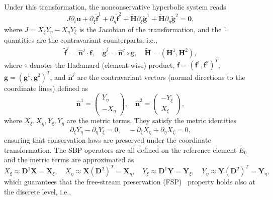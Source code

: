 \documentclass[]{scrartcl}
\newcommand{\mtx}[1]{\boldsymbol{#1}}
\renewcommand{\vec}[1]{\boldsymbol{#1}}
\theoremstyle{definition}
\begin{document}
Under this transformation, the nonconservative hyperbolic system reads
\begin{equation}
J \partial_t \vec{u} + \partial_\xi \tilde{\vec{f}}^1 + \partial_\eta \tilde{\vec{f}}^2 + \tilde{\vec{H}} \partial_\xi \tilde{\vec{g}}^1 + \tilde{\vec{H}} \partial_\eta \tilde{\vec{g}}^2 = \vec{0},
\end{equation}
where $J = X_\xi Y_\eta - X_\eta Y_\xi$ is the Jacobian of the transformation, and the $\tilde{\cdot}$ quantities are the contravariant counterparts, i.e.,
\begin{equation}
    \tilde{\vec{f}}^j = \hat{\vec{n}}^j \cdot \vec{f}, \quad
    \tilde{\vec{g}}^j = \hat{\vec{n}}^j \circ \vec{g}, \quad
    \tilde{\vec{H}} = \left (\vec{H}^1, \vec{H}^2 \right ),
\end{equation}
where $\circ$ denotes the Hadamard (element-wise) product, $\vec{f} = (\vec{f}^1, \vec{f}^2)^T$, $\vec{g} = (\vec{g}^1, \vec{g}^2)^T$, and $\hat{\vec{n}}^j$ are the contravariant vectors (normal directions to the coordinate lines) defined as
\begin{equation}
    \hat{\vec{n}}^1 = \begin{pmatrix} Y_\eta \\ -X_\eta \end{pmatrix}, \quad
    \hat{\vec{n}}^2 = \begin{pmatrix} -Y_\xi \\ X_\xi \end{pmatrix},
\end{equation}
where $X_\xi, X_\eta, Y_\xi, Y_\eta$ are the metric terms.
They satisfy the metric identities~\cite{vinokur2002extension, Kopriva2006, Kopriva2009}
\begin{equation}
\partial_\xi Y_\eta - \partial_\eta Y_\xi = 0, \quad -\partial_\xi X_\eta + \partial_\eta X_\xi = 0,
\label{metric_identities}
\end{equation}
ensuring that conservation laws are preserved under the coordinate transformation.
The SBP operators are all defined on the reference element $E_0$ and the metric terms are approximated as
\begin{equation}
X_\xi \approx \mtx{D}^1 \vec{X} = \vec{X}_\xi, \quad X_\eta \approx \vec{X} \left ( \mtx{D}^2  \right )^T = \vec{X}_\eta, \quad Y_\xi \approx \mtx{D}^1 \vec{Y} = \vec{Y}_\xi, \quad Y_\eta \approx \vec{Y} \left ( \mtx{D}^2 \right )^T = \vec{Y}_\eta,
\end{equation}
which guarantees that the free-stream preservation (FSP)~\cite{VisbalGaitonde1999, Kopriva2006} property holds also at the discrete level, i.e.,
\end{document}
